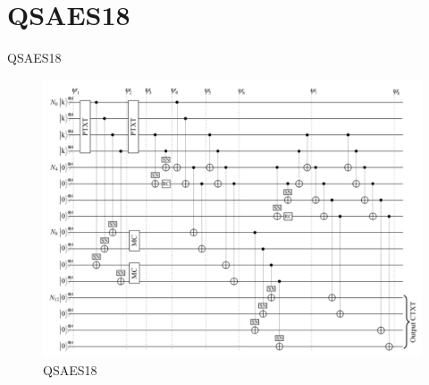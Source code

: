 \section{QSAES18}

\begin{frame}{QSAES18}

\begin{figure}[h!]
    \centering
    \includegraphics[width=0.8\linewidth]{saes18/qsaes18.png}
    \caption{QSAES18}
    \label{fig:qaes18}
\end{figure}

\end{frame}

